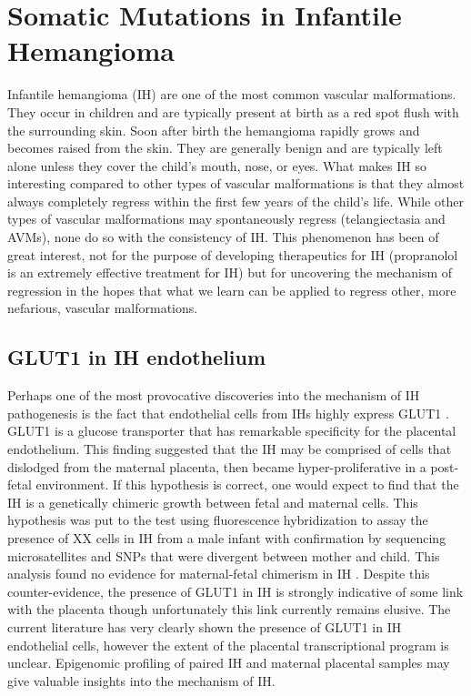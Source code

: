 \section{Somatic Mutations in Infantile Hemangioma}
Infantile hemangioma (IH) are one of the most common vascular malformations. They occur in children and are typically present at birth as a red spot flush with the surrounding skin. Soon after birth the hemangioma rapidly grows and becomes raised from the skin. They are generally benign and are typically left alone unless they cover the child's mouth, nose, or eyes. What makes IH so interesting compared to other types of vascular malformations is that they almost always completely regress within the first few years of the child's life. While other types of vascular malformations may spontaneously regress (telangiectasia and AVMs), none do so with the consistency of IH. This phenomenon has been of great interest, not for the purpose of developing therapeutics for IH (propranolol is an extremely effective treatment for IH) but for uncovering the mechanism of regression in the hopes that what we learn can be applied to regress other, more nefarious, vascular malformations. 

\subsection{GLUT1 in IH endothelium}
Perhaps one of the most provocative discoveries into the mechanism of IH pathogenesis is the fact that endothelial cells from IHs highly express GLUT1 \citep{north2000, north2001}. GLUT1 is a glucose transporter that has remarkable specificity for the placental endothelium. This finding suggested that the IH may be comprised of cells that dislodged from the maternal placenta, then became hyper-proliferative in a post-fetal environment. If this hypothesis is correct, one would expect to find that the IH is a genetically chimeric growth between fetal and maternal cells. This hypothesis was put to the test using fluorescence  hybridization to assay the presence of XX cells in IH from a male infant with confirmation by sequencing microsatellites and SNPs that were divergent between mother and child. This analysis found no evidence for maternal-fetal chimerism in IH \citep{pittman2006}. Despite this counter-evidence, the presence of GLUT1 in IH is strongly indicative of some link with the placenta though unfortunately this link currently remains elusive. The current literature has very clearly shown the presence of GLUT1 in IH endothelial cells, however the extent of the placental transcriptional program is unclear. Epigenomic profiling of paired IH and maternal placental samples may give valuable insights into the mechanism of IH. 

